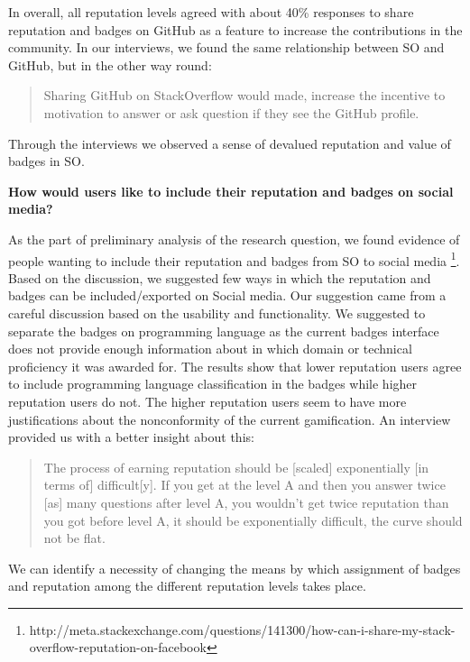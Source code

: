 \documentclass{sigchi}
\begin{document}
In overall, all reputation levels agreed with about 40\% responses to share reputation and badges on GitHub as a feature to increase the contributions in the community. In our interviews, we found the same relationship between SO and GitHub, but in the other way round:

\begin{quote}
Sharing GitHub on StackOverflow would made, increase the incentive to motivation to answer or ask question if they see the GitHub profile.
\end{quote}

Through the interviews we observed a sense of devalued reputation and value of badges in SO.

\textbf{How would users like to include their reputation and badges on social media?}

As the part of preliminary analysis of the research question, we found evidence of people wanting to include their reputation and badges from SO to social media \footnote{http://meta.stackexchange.com/questions/141300/how-can-i-share-my-stack-overflow-reputation-on-facebook}. Based on the discussion, we suggested few ways in which the reputation and badges can be included/exported on Social media. Our suggestion came from a careful discussion based on the usability and functionality. We suggested to separate the badges on programming language as the current badges interface does not provide enough information about in which domain or technical proficiency it was awarded for. The results show that lower reputation users agree to include programming language classification in the badges while higher reputation users do not. The higher reputation users seem to have more justifications about the nonconformity of the current gamification. An interview provided us with  a better insight about this:

\begin{quote}
The process of earning reputation should be [scaled] exponentially [in terms of] difficult[y]. If you get at the level A and then you answer twice [as] many questions after level A, you wouldn’t get twice reputation than you got before level A, it should be exponentially difficult, the curve should not be flat.
\end{quote}

We can identify a necessity of changing the means by which assignment of  badges and reputation among the different reputation levels takes place.
\end{document}
